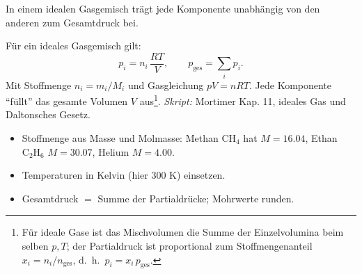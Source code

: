 

In einem idealen Gasgemisch trägt jede Komponente unabh\"angig von den
anderen zum Gesamtdruck bei.

\begin{werkzeugkasten}
F\"ur ein ideales Gasgemisch gilt:
\[
  p_i = n_i\,\frac{RT}{V} , \qquad
  p_{\text{ges}} = \sum_i p_i .
\]
Mit Stoffmenge $n_i = m_i/M_i$ und Gasgleichung $pV = nRT$.
Jede Komponente ``f\"ullt'' das gesamte Volumen $V$ aus\footnote{F\"ur
ideale Gase ist das Mischvolumen die Summe der Einzelvolumina beim selben
$p,T$; der Partialdruck ist proportional zum Stoffmengenanteil
$x_i = n_i/n_{\text{ges}}$, d.~h.\ $p_i = x_i\,p_{\text{ges}}$.}.
\textit{Skript:} Mortimer Kap. 11, ideales Gas und Daltonsches Gesetz.
\end{werkzeugkasten}

\begin{achtung}
\begin{itemize}
  \item Stoffmenge aus Masse und Molmasse: Methan $\mathrm{CH_4}$ hat
        $M=16.04$, Ethan $\mathrm{C_2H_6}$ $M=30.07$, Helium $M=4.00$.
  \item Temperaturen in Kelvin (hier 300 K) einsetzen.
  \item Gesamtdruck $=$ Summe der Partialdr\"ucke; Mohrwerte runden.
\end{itemize}
\end{achtung}
